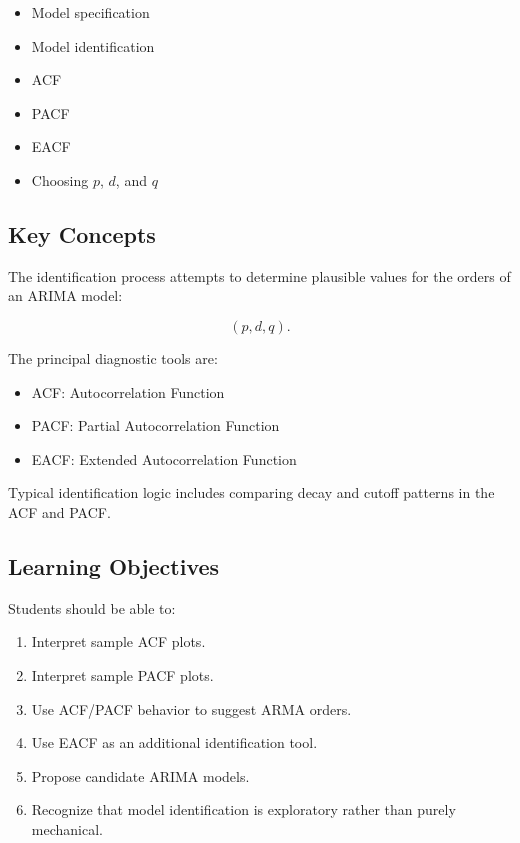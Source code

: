 \documentclass[11pt]{article}
\begin{document}
\begin{itemize}
    \item Model specification
    \item Model identification
    \item ACF
    \item PACF
    \item EACF
    \item Choosing $p$, $d$, and $q$
\end{itemize}

\subsection{Key Concepts}

The identification process attempts to determine plausible values for
the orders of an ARIMA model:

\[
(p,d,q).
\]

The principal diagnostic tools are:

\begin{itemize}
    \item ACF: Autocorrelation Function
    \item PACF: Partial Autocorrelation Function
    \item EACF: Extended Autocorrelation Function
\end{itemize}

Typical identification logic includes comparing decay and cutoff
patterns in the ACF and PACF.

\subsection{Learning Objectives}

Students should be able to:

\begin{enumerate}
    \item Interpret sample ACF plots.
    \item Interpret sample PACF plots.
    \item Use ACF/PACF behavior to suggest ARMA orders.
    \item Use EACF as an additional identification tool.
    \item Propose candidate ARIMA models.
    \item Recognize that model identification is exploratory rather
          than purely mechanical.
\end{enumerate}
\end{document}

